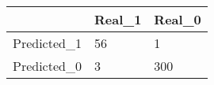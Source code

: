 \begin{tabular}{lll}
& Real_1 & Real_0 \\ 
\hline 
Predicted_1 & 56 & 1 \\ 
Predicted_0 & 3 & 300 \\ 
\hline 
\end{tabular}